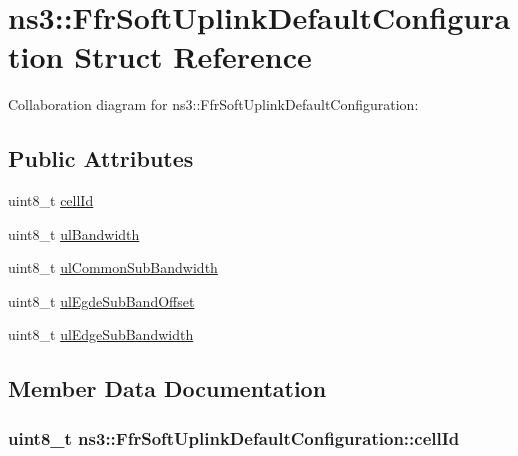 \hypertarget{structns3_1_1FfrSoftUplinkDefaultConfiguration}{}\section{ns3\+:\+:Ffr\+Soft\+Uplink\+Default\+Configuration Struct Reference}
\label{structns3_1_1FfrSoftUplinkDefaultConfiguration}


Collaboration diagram for ns3\+:\+:Ffr\+Soft\+Uplink\+Default\+Configuration\+:
\subsection*{Public Attributes}
\begin{DoxyCompactItemize}
\item 
uint8\+\_\+t \hyperlink{structns3_1_1FfrSoftUplinkDefaultConfiguration_ac9402b9376e3a99c49ac77d6d46cdf4e}{cell\+Id}
\item 
uint8\+\_\+t \hyperlink{structns3_1_1FfrSoftUplinkDefaultConfiguration_a4299325c4312f12378ce64c0a8d09457}{ul\+Bandwidth}
\item 
uint8\+\_\+t \hyperlink{structns3_1_1FfrSoftUplinkDefaultConfiguration_a12923ce928c7c299b313a0deed9cba49}{ul\+Common\+Sub\+Bandwidth}
\item 
uint8\+\_\+t \hyperlink{structns3_1_1FfrSoftUplinkDefaultConfiguration_a7dbcc1395c87f04ab3b9eee58ec80674}{ul\+Egde\+Sub\+Band\+Offset}
\item 
uint8\+\_\+t \hyperlink{structns3_1_1FfrSoftUplinkDefaultConfiguration_afcebad0c4c6c0caa19b6b8f6ec82e140}{ul\+Edge\+Sub\+Bandwidth}
\end{DoxyCompactItemize}


\subsection{Member Data Documentation}
\subsubsection[{\texorpdfstring{cell\+Id}{cellId}}]{\setlength{\rightskip}{0pt plus 5cm}uint8\+\_\+t ns3\+::\+Ffr\+Soft\+Uplink\+Default\+Configuration\+::cell\+Id}\hypertarget{structns3_1_1FfrSoftUplinkDefaultConfiguration_ac9402b9376e3a99c49ac77d6d46cdf4e}{}\label{structns3_1_1FfrSoftUplinkDefaultConfiguration_ac9402b9376e3a99c49ac77d6d46cdf4e}
